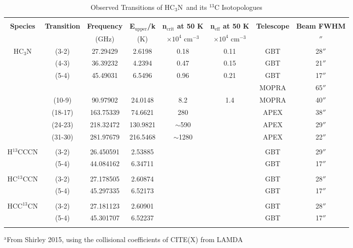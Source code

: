 \documentclass[twocolumn]{emulateapj}
\newcommand{\cyano}{HC$_3$N}
\begin{document}
\begin{table}[ht]
\caption{Observed Transitions of \cyano\, and its $^{13}$C Isotopologues} 
\centering
\begin{tabular}{cccccccc}
\\[0.5ex]
\hline\hline
& & & & & & &\\
{\bf Species} & {\bf Transition} & {\bf Frequency} & {\bf E$_{\mathrm{upper}}$/k} & {\bf n$_{\mathrm{crit}}$ at 50 K}  & {\bf n$_{\mathrm{eff}}$ at 50 K}\footnotemark[a]  & {\bf Telescope} & {\bf Beam FWHM} \\ [0.5ex]
				& 		& {(GHz)} 	& {(K)} 		&$\times 10^{4}$ cm$^{-3}$ & $\times 10^{4}$ cm$^{-3}$ & & $''$\\
\hline
\cyano   			& (3-2)  	&   27.29429 	&     2.6198 	& 0.18 		& 0.11 	& GBT 		& 28$''$ \\
				& (4-3)    	&   36.39232 	&     4.2394 	& 0.47 		& 0.15 	& GBT 		& 21$''$ \\
				& (5-4)    	&   45.49031 	&     6.5496 	& 0.96 		& 0.21 	& GBT 		& 17$''$ \\
				&		&  		    	&   			& 			&		& MOPRA 	& 65$''$ \\
				& (10-9)    &   90.97902	&   24.0148	& 8.2 		& 1.4 	& MOPRA 	& 40$''$ \\
				& (18-17)  & 163.75339   	&   74.6621	& 280		&		& APEX 		& 38$''$ \\
				& (24-23)  & 218.32472	& 130.9821	& $\sim$590	&		& APEX 		& 29$''$ \\
				& (31-30) 	& 281.97679	& 216.5468	& $\sim$1280	&		& APEX 		& 22$''$ \\
				& & & & & & &  \\
\hline
H$^{13}$CCCN		& (3-2) 	& 26.450591	& 2.53885 	&			& 		& GBT 		& 29$''$ \\
				& (5-4)     	& 44.084162	& 6.34711		&			&		& GBT 		& 17$''$ \\
				& & & & & & &  \\
\hline
HC$^{13}$CCN 	& (3-2)  	& 27.178505 	& 2.60874 	&			&		& GBT 		& 28$''$ \\
				& (5-4)     	& 45.297335	& 6.52173		&			&		& GBT 		& 17$''$ \\
				& &  & & & & & \\
\hline
HCC$^{13}$CN 	& (3-2)  	& 27.181123	& 2.60901		&			&		& GBT 		& 28$''$ \\
				& (5-4)     	& 45.301707	& 6.52237		&			&		& GBT 		& 17$''$ \\
				& & & & & & &  \\
\hline
\end{tabular}
\label{HC3N}
\end{table}
\noindent\footnotesize{$^{\mathrm{a}}$From Shirley 2015, using the collisional coefficients  of CITE(X) from LAMDA}
\clearpage
\end{document}
